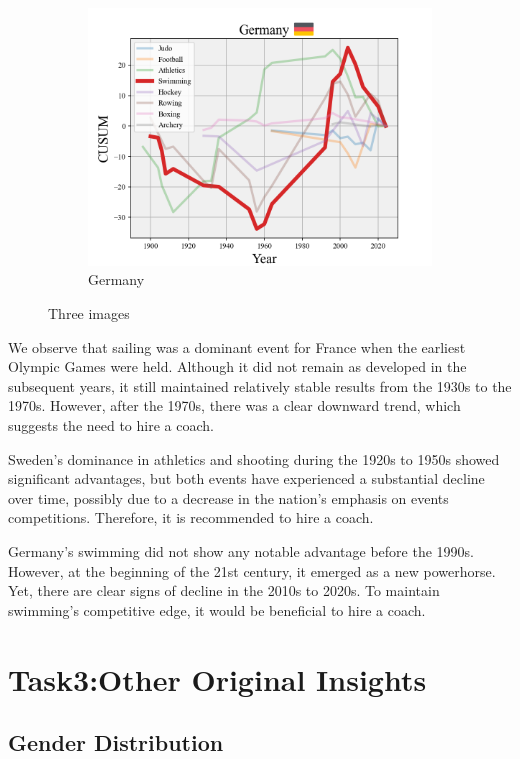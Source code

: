 \documentclass[12pt]{article}  %
\begin{document}
\begin{figure}[htbp]
\begin{subfigure}[b]{.32\textwidth}
		\includegraphics[width=\textwidth]{img/Decline3.png}
		\caption{Germany}\label{subfig:3}
	\end{subfigure}
	\caption{Three images}\label{fig:subfigures}
\end{figure}

We observe that sailing was a dominant event for France when the earliest Olympic Games were held. Although it did not remain as developed in the subsequent years, it still maintained relatively stable results from the 1930s to the 1970s. However, after the 1970s, there was a clear downward trend, which suggests the need to hire a coach.

Sweden's dominance in athletics and shooting during the 1920s to 1950s showed significant advantages, but both events have experienced a substantial decline over time, possibly due to a decrease in the nation's emphasis on events competitions. Therefore, it is recommended to hire a coach.

Germany’s swimming did not show any notable advantage before the 1990s. However, at the beginning of the 21st century, it emerged as a new powerhorse. Yet, there are clear signs of decline in the 2010s to 2020s. To maintain swimming’s competitive edge, it would be beneficial to hire a coach.



\section{Task3:Other Original Insights}

\subsection{Gender Distribution}
\end{document}
